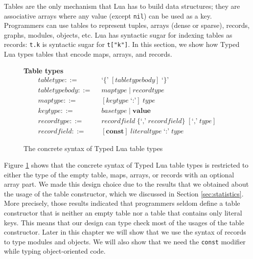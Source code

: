 Tables are the only mechanism that Lua has to build data structures;
they are associative arrays where any value (except \texttt{nil})
can be used as a key.
Programmers can use tables to represent tuples, arrays (dense or sparse),
records, graphs, modules, objects, etc.
Lua has syntactic sugar for indexing tables as records:
\texttt{t.k} is syntactic sugar for \texttt{t["k"]}.
In this section, we show how Typed Lua types tables that encode maps,
arrays, and records.

\begin{figure}[!ht]
\textbf{Table types}\\
\dstart
\begin{align*}
\textit{tabletype} ::= & \;\; \texttt{`\{'} \; [\textit{tabletypebody}] \; \texttt{`\}'}\\
\textit{tabletypebody} ::= & \;\; \textit{maptype} \; | \;
  \textit{recordtype}\\
\textit{maptype} ::= & \;\; [\textit{keytype} \; \texttt{`:'}] \; \textit{type}\\
\textit{keytype} ::= & \;\; \textit{basetype} \; | \;
  \textbf{value}\\
\textit{recordtype} ::= & \;\; \textit{recordfield} \; \{\texttt{`,'} \; \textit{recordfield}\} \; [\texttt{`,'} \; \textit{type}]\\
\textit{recordfield} ::= & \;\; [\textbf{const}] \; \textit{literaltype} \; \texttt{`:'} \; \textit{type}
\end{align*}
\dend
\caption{The concrete syntax of Typed Lua table types}
\label{fig:tables}
\end{figure}

Figure \ref{fig:tables} shows that the concrete syntax of Typed Lua
table types is restricted to either the type of the empty table,
maps, arrays, or records with an optional array part.
We made this design choice due to the results that we obtained
about the usage of the table constructor, which we discussed
in Section \ref{sec:statistics}.
More precisely, those results indicated that programmers seldom
define a table constructor that is neither an empty table nor
a table that contains only literal keys.
This means that our design can type check most of the usages of
the table constructor.
Later in this chapter we will show that we use the syntax of records
to type modules and objects.
We will also show that we need the \texttt{const} modifier while
typing object-oriented code.


